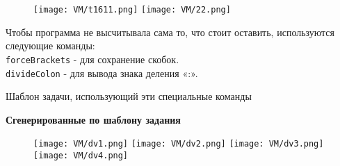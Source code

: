 \begin{figure}[h]
		\centering
		\texttt{[image: VM/t1611.png]}
		\texttt{[image: VM/22.png]}
\end{figure}

 Чтобы программа не высчитывала сама то, что стоит оставить, используются следующие команды:
\\ \texttt{forceBrackets} - для сохранение скобок.
\\ \texttt{divideColon} - для вывода знака деления «:».

Шаблон задачи, использующий эти специальные команды



\textbf{Сгенерированные по шаблону задания}

		\begin{figure}[h]
		\centering
		\texttt{[image: VM/dv1.png]}
		\texttt{[image: VM/dv2.png]}
		\texttt{[image: VM/dv3.png]}
		\texttt{[image: VM/dv4.png]}
\end{figure}

